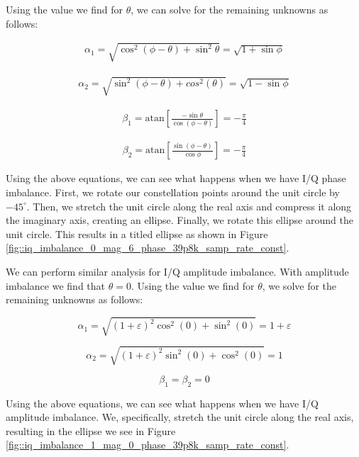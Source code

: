 \documentclass{article}
\begin{document}
Using the value we find for $\theta$, we can solve for the remaining unknowns as follows:

\begin{align}
	\alpha_1 = \sqrt{\cos^2(\phi-\theta)+\sin^2\theta} = \sqrt{1+\sin\phi}
\end{align}

\begin{align}
	\alpha_2 = \sqrt{\sin^2(\phi-\theta)+cos^2(\theta)} = \sqrt{1-\sin\phi}
\end{align}

\begin{align}
	\beta_1 = \text{atan}\left[\frac{-\sin\theta}{\cos(\phi-\theta)}\right] = -\frac{\pi}{4}
\end{align}

\begin{align}
	\beta_2 = \text{atan}\left[\frac{\sin(\phi-\theta)}{\cos\phi}\right] = -\frac{\pi}{4}
\end{align}

Using the above equations, we can see what happens when we have I/Q phase imbalance. First, we rotate our constellation points around the unit circle by $-45^{\circ}$. Then, we stretch the unit circle along the real axis and compress it along the imaginary axis, creating an ellipse. Finally, we rotate this ellipse around the unit circle. This results in a titled ellipse as shown in Figure \ref{fig::iq_imbalance_0_mag_6_phase_39p8k_samp_rate_const}.

We can perform similar analysis for I/Q amplitude imbalance. With amplitude imbalance we find that $\theta = 0$. Using the value we find for $\theta$, we solve for the remaining unknowns as follows:

\begin{equation}
	\alpha_1 = \sqrt{(1+\varepsilon)^2\cos^2(0)+\sin^2(0)} = 1 + \varepsilon
\end{equation}

\begin{equation}
	\alpha_2 = \sqrt{(1+\varepsilon)^2\sin^2(0)+\cos^2(0)} = 1
\end{equation}

\begin{equation}
	\beta_1 = \beta_2 = 0
\end{equation}

Using the above equations, we can see what happens when we have I/Q amplitude imbalance. We, specifically, stretch the unit circle along the real axis, resulting in the ellipse we see in Figure \ref{fig::iq_imbalance_1_mag_0_phase_39p8k_samp_rate_const}.
\end{document}
